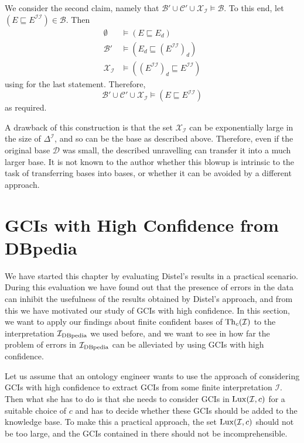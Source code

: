 \begin{Proof}
  We consider the second claim, namely that $\mathcal{B}' \cup \mathcal{C}' \cup
  \mathcal{X}_{\mathcal{I}} \models \mathcal{B}$.  To this end, let $(E \sqsubseteq
  E^{\mathcal{I}\mathcal{I}}) \in \mathcal{B}$.  Then
  \begin{align*}
    \emptyset &\models (E \sqsubseteq E_d)\\
    \mathcal{B}' &\models (E_d \sqsubseteq (E^{\mathcal{I}\mathcal{I}})_d)\\
    \mathcal{X}_{\mathcal{I}} &\models ((E^{\mathcal{I}\mathcal{I}})_d \sqsubseteq E^{\mathcal{I}\mathcal{I}})
  \end{align*}
  using  for the last statement.  Therefore,
  \begin{equation*}
    \mathcal{B}' \cup \mathcal{C}' \cup \mathcal{X}_{\mathcal{I}} \models (E \sqsubseteq
    E^{\mathcal{I}\mathcal{I}})
  \end{equation*}
  as required.
\end{Proof}

A drawback of this construction is that the set $\mathcal{X}_{\mathcal{I}}$ can be
exponentially large in the size of $\Delta^{\mathcal{I}}$, and so can be the \ELbot base
as described above.  Therefore, even if the original base $\mathcal{D}$ was small, the
described unravelling can transfer it into a much larger base.  It is not known to the
author whether this blowup is intrinsic to the task of transferring \ELgfpbot bases into
\ELbot bases, or whether it can be avoided by a different approach.

\section{GCIs with High Confidence from DBpedia}
\label{sec:exper-with-conf}

We have started this chapter by evaluating Distel's results in a practical scenario.
During this evaluation we have found out that the presence of errors in the data can
inhibit the usefulness of the results obtained by Distel's approach, and from this we have
motivated our study of GCIs with high confidence.  In this section, we want to apply our
findings about finite confident bases of $\operatorname{Th}_c(\mathcal{I})$ to the interpretation
${\mathcal{I}_{\text{DBpedia}}}$ we used before, and we want to see in how far the problem of errors in
${\mathcal{I}_{\text{DBpedia}}}$ can be alleviated by using GCIs with high confidence.

Let us assume that an ontology engineer wants to use the approach of considering GCIs with
high confidence to extract GCIs from some finite interpretation $\mathcal{I}$.  Then what
she has to do is that she needs to consider GCIs in $\operatorname{Lux}(\mathcal{I}, c)$ for a suitable
choice of $c$ and has to decide whether these GCIs should be added to the knowledge base.
To make this a practical approach, the set $\operatorname{Lux}(\mathcal{I}, c)$ should not be too large,
and the GCIs contained in there should not be incomprehensible.

